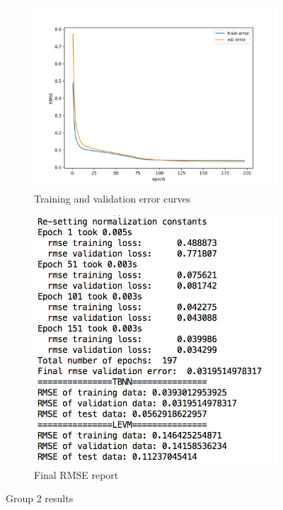 \documentclass{article}
\numberwithin{equation}{section}
\begin{document}
\begin{figure}[h]
    \centering
    \begin{subfigure}{0.6\textwidth}
        \includegraphics[width=1.0\linewidth]{results/170samples/convergence.png}
        \caption{Training and validation error curves}
        \label{fig:convergence_group2}
    \end{subfigure}
    \begin{subfigure}{0.38\textwidth}
        \includegraphics[width=1.0\linewidth]{results/170samples/output.png}
        \caption{Final RMSE report}
        \label{fig:output_group2}
    \end{subfigure}
    \caption{Group 2 results}
    \label{fig:results_group2}
\end{figure}
\end{document}
